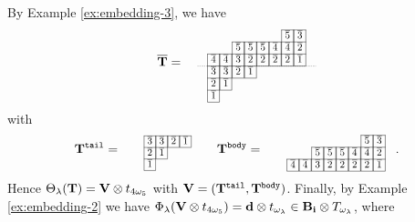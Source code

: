 \documentclass[leqno,11pt]{amsart}
\numberwithin{equation}{section}
\newcommand{\bs}{\boldsymbol}
\newcommand{\B}{\mathbf{B}}
\newcommand{\ov}{\overline}
\newcommand{\bi}{\bs{\rm i}}
\newcommand{\la}{\lambda}
\begin{document}
\noindent By Example \ref{ex:embedding-3}, we have 
$$
\ov{\bf T}=\quad 
\resizebox{.27\hsize}{!}
{\def\lr#1{\multicolumn{1}{|@{\hspace{.75ex}}c@{\hspace{.75ex}}|}{\raisebox{-.04ex}{$#1$}}}\raisebox{-.6ex}
{$\begin{array}{ccccccccccccccccccc}
\cline{8-9}
& & & & & & & \lr{\ov{5}} & \lr{\ov{3}} &  \\
\cline{4-9}
& & & \lr{\ov{5}}  & \lr{\ov{5}}   & \lr{\ov{5}} & \lr{\ov{4}}  & \lr{\ov{4}}  & \lr{\ov{2}}\\
\cline{2-9}
& \lr{\ov{4}} & \lr{\ov{4}}  & \lr{\ov{3}} & \lr{\ov{2}} & \lr{\ov{2}} & \lr{\ov{2}} & \lr{\ov{2}} &  \lr{\ov{1}}\\
\cline{2-9}\cdashline{1-11}[0.5pt/1pt]
& \lr{\ov{3}} & \lr{\ov{3}} & \lr{\ov 2} & \lr{\ov{1}}   \\
\cline{2-5}
& \lr{\ov{2}} &  \lr{\ov{1}} \\
\cline{2-3}
& \lr{\ov{1}} \\
\cline{2-2}
\end{array}$}}
$$ \vskip 2mm
\noindent with
$$
{\bf T}^{\tt tail}=\quad 
\resizebox{.13\hsize}{!}
{\def\lr#1{\multicolumn{1}{|@{\hspace{.75ex}}c@{\hspace{.75ex}}|}{\raisebox{-.04ex}{$#1$}}}\raisebox{-.6ex}
{$\begin{array}{ccccccccccccccccccc}
\cline{2-9}
& \lr{\ov{3}} & \lr{\ov{3}} & \lr{\ov 2} & \lr{\ov{1}}   \\
\cline{2-5}
& \lr{\ov{2}} &  \lr{\ov{1}} \\
\cline{2-3}
& \lr{\ov{1}} \\
\cline{2-2}
\end{array}$}}
\quad\quad
{\bf T}^{\tt body}=\quad 
\resizebox{.27\hsize}{!}
{\def\lr#1{\multicolumn{1}{|@{\hspace{.75ex}}c@{\hspace{.75ex}}|}{\raisebox{-.04ex}{$#1$}}}\raisebox{-.6ex}
{$\begin{array}{ccccccccccccccccccc}
\cline{8-9}
& & & & & & & \lr{\ov{5}} & \lr{\ov{3}} &  \\
\cline{4-9}
& & & \lr{\ov{5}}  & \lr{\ov{5}}   & \lr{\ov{5}} & \lr{\ov{4}}  & \lr{\ov{4}}  & \lr{\ov{2}}\\
\cline{2-9}
& \lr{\ov{4}} & \lr{\ov{4}}  & \lr{\ov{3}} & \lr{\ov{2}} & \lr{\ov{2}} & \lr{\ov{2}} & \lr{\ov{2}} &  \lr{\ov{1}}\\
\cline{2-9}
\end{array}$}}.
$$ \vskip 2mm 
\noindent  
Hence $\Theta_\la({\bf T})={\bf V}\otimes t_{4\omega_5}$ with ${\bf V}=({\bf T}^{\tt tail}, {\bf T}^{\tt body})$. 
Finally, by Example \ref{ex:embedding-2} we have $\Phi_\la({\bf V}\otimes t_{4\omega_5})={\bf d}\otimes t_{\omega_\la}\in \B_{\bi}\otimes T_{\omega_\la}$, where
\end{document}
